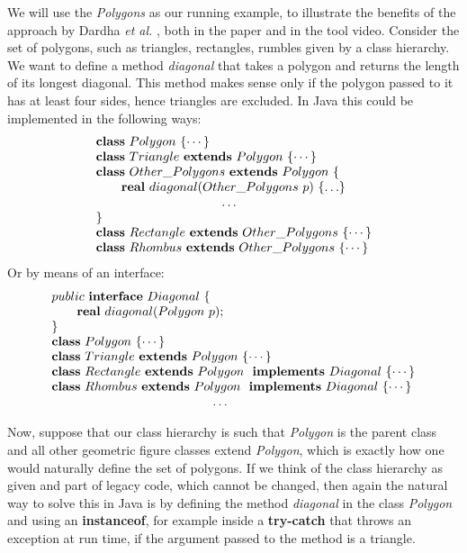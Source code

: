 \documentclass[runningheads]{llncs}
\begin{document}
\begin{example}
We will use the \emph{Polygons} as our running example, to illustrate the benefits of the approach by Dardha \emph{et al.} \cite{Dardha2013,Dardha2017}, both in the paper and in the tool video.
Consider the set of polygons, such as triangles, rectangles, rumbles given by a class hierarchy.
We want to define a method \emph{diagonal} that takes a polygon and returns the length of its longest diagonal. This method makes sense only if the polygon passed to it has at least four sides, hence triangles are excluded.
In Java this could be implemented in the following ways:
$$
\begin{array}{l}
\synclass Polygon \ \{ \cdots\}
\\
\syndecl{Triangle}{Polygon} {\cdots}
\\
\syndecl{Other\_Polygons}{Polygon} {
\\
	\qquad \mathbf{real}\ diagonal(Other\_Polygons \ p)\ \{\ldots \}
	\\
	\hspace{3.5cm} \ldots
	\\
}
\\
\syndecl{Rectangle}{Other\_Polygons}{\cdots}
\\
\syndecl{Rhombus}{Other\_Polygons} {\cdots}
\end{array}
$$
Or by means of an interface:
$$
\begin{array}{l}
public \ \syninterface Diagonal\ \{
	\\
	\qquad \mathbf{real}\ diagonal(Polygon \ p);
	\\
\}
\\
\synclass Polygon \ \{\cdots\}
\\
\syndecl{Triangle}{Polygon} {\cdots}
\\
\synidecl{Rectangle}{Polygon} \synimpl Diagonal \ \{\cdots\}
\\
\synidecl{Rhombus}{Polygon} \synimpl Diagonal \ \{\cdots\}
\\
\hspace{4.5cm} \ldots
\end{array}
$$

Now, suppose that our class hierarchy is such that \emph{Polygon} is the parent class and all other geometric figure classes extend \emph{Polygon}, which is exactly how one would naturally define the set of polygons. If we think of the class hierarchy as given and part of legacy code, which cannot be changed, then again the natural way to solve this in Java is by defining the method \emph{diagonal} in the class \emph{Polygon} and using an \textbf{instanceof}, for example inside a \textbf{try-catch} that throws an exception at run time, if the argument passed to the method is a triangle.


\end{example}
\end{document}
